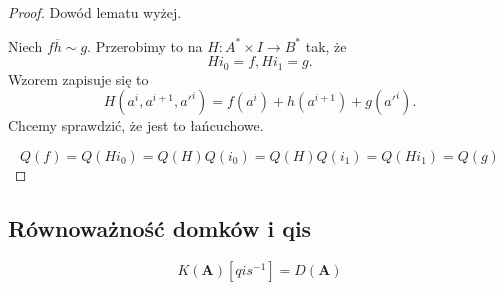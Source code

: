 \begin{proof}
  Dowód lematu wyżej.

  Niech $f\overline{h}{\sim} g$. Przerobimy to na $H:A^*\times I\to B^*$ tak, że 
  $$Hi_0=f, Hi_1=g.$$
  Wzorem zapisuje się to 
  $$H(a^i, a^{i+1}, a'^i)=f(a^i)+h(a^{i+1})+g(a'^i).$$
  Chcemy sprawdzić, że jest to łańcuchowe. 
  \begin{center}\end{center}
  $$Q(f)=Q(Hi_0)=Q(H)Q(i_0)=Q(H)Q(i_1)=Q(Hi_1)=Q(g)$$
\end{proof}

\subsection{Równoważność domków i qis}

\begin{fact}
  $$K(\mathbf{A})[qis^{-1}]=D(\mathbf{A})$$
\end{fact}


